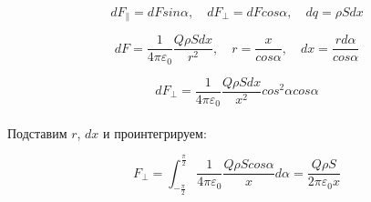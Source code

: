 \documentclass{article}
\begin{document}
\paragraph{}
\noindent{}
\paragraph{}

\begin{equation*}
  dF_\parallel = dFsin\alpha, \quad dF_\perp = dFcos\alpha, \quad dq = \rho Sdx
\end{equation*}

\begin{equation*}
  dF = \frac{1}{4\pi\varepsilon_0}\frac{Q\rho Sdx}{r^2}, \quad r = \frac{x}{cos\alpha},
  \quad dx = \frac{rd\alpha}{cos\alpha}
\end{equation*}

\begin{equation*}
  dF_\perp = \frac{1}{4\pi\varepsilon_0}\frac{Q\rho Sdx}{x^2}cos^2\alpha cos\alpha
\end{equation*}
\paragraph{}

Подставим $r$, $dx$ и проинтегрируем:

\begin{equation*}
  F_\perp = \int_{-\frac{\pi}{2}}^{\frac{\pi}{2}}\frac{1}{4\pi\varepsilon_0}\frac{Q\rho Scos\alpha}{x}d\alpha =
  \frac{Q\rho S}{2\pi\varepsilon_0x}
\end{equation*}
\end{document}
